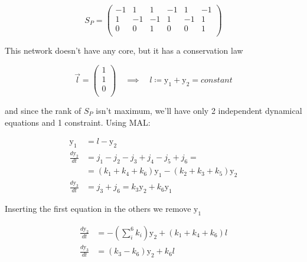 \documentclass{article}
\begin{document}
\begin{center}
    \begin{equation}
        S_P=\begin{pmatrix}
            -1 & 1 & 1 & -1 & 1 & -1 \\
            1 & -1 & -1 & 1 & -1 & 1 \\
            0 & 0 & 1 & 0 & 0 & 1 \\
        \end{pmatrix}
    \end{equation}
\end{center}

This network doesn't have any core, but it has a conservation law

\begin{center}
    \begin{equation}
        \Vec{l}=\begin{pmatrix}
            1 \\
            1 \\
            0 \\
        \end{pmatrix}
         \quad \implies \quad l \coloneqq \textrm{y}_1+\textrm{y}_2=constant
    \end{equation}
\end{center}

and since the rank of $S_P$ isn't maximum, we'll have only 2 independent dynamical equations and 1 constraint. Using MAL:

\begin{center}
    \begin{equation}
    \begin{aligned}
    \textrm{y}_1 &= l -\textrm{y}_2 \\
        \frac{d \textrm{y}_2}{d t} &=j_1-j_2-j_3+j_4-j_5+j_6 =\\
        &=\left(k_1+k_4+k_6\right) \textrm{y}_1- \left(k_2+k_3+k_5 \right) \textrm{y}_2\\
        \frac{d \textrm{y}_3}{d t} &= j_3+j_6 = k_3 \textrm{y}_2 + k_6 \textrm{y}_1 
        \end{aligned}
    \end{equation}
\end{center}

Inserting the first equation in the others we remove $\textrm{y}_1$

\begin{center}
    \begin{equation}
    \begin{aligned}
        \frac{d \textrm{y}_2}{d t} &=-\left( \sum^6_i k_i\right) \textrm{y}_2 + \left( k_1+k_4+k_6\right) l\\
        \frac{d \textrm{y}_3}{d t} &= \left(k_3 - k_6 \right) \textrm{y}_2 + k_6 l
        \end{aligned}
        \label{12}
    \end{equation}
\end{center}
\end{document}
